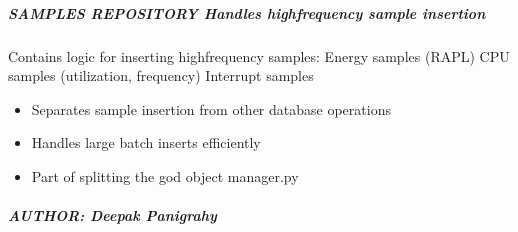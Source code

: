 \documentclass[letterpaper,10pt,english]{sphinxmanual}
\begin{document}
\subparagraph{SAMPLES REPOSITORY \textendash{} Handles high\sphinxhyphen{}frequency sample insertion}
\label{\detokenize{core.database.repositories.samples:samples-repository-handles-high-frequency-sample-insertion}}\begin{description}
\sphinxAtStartPar
Contains logic for inserting high\sphinxhyphen{}frequency samples:
\sphinxhyphen{} Energy samples (RAPL)
\sphinxhyphen{} CPU samples (utilization, frequency)
\sphinxhyphen{} Interrupt samples

\begin{itemize}
\item {} 
\sphinxAtStartPar
Separates sample insertion from other database operations

\item {} 
\sphinxAtStartPar
Handles large batch inserts efficiently

\item {} 
\sphinxAtStartPar
Part of splitting the god object manager.py

\end{itemize}

\end{description}


\subparagraph{AUTHOR: Deepak Panigrahy}
\label{\detokenize{core.database.repositories.samples:author-deepak-panigrahy}}
\end{document}
